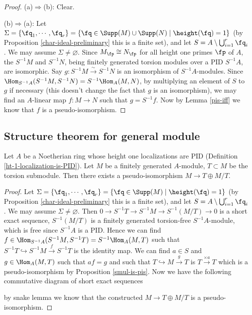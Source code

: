 \begin{proof}
(a)$\Rightarrow$(b): Clear.

(b)$\Rightarrow$(a): Let $\Sigma=\{\fq_1,\cdots,\fq_r\}
=\{\fq\in\Supp(M)\cup\Supp(N)\mid\height(\fq)=1\}$
(by Proposition \ref{char-ideal-preliminary} this is a finite set),
and let $S=A\setminus\bigcup_{i=1}^r\fq_i$.
We may assume $\Sigma\neq\varnothing$.
Since $M_\fp\cong N_\fp$ for all height one primes $\fp$ of $A$,
the $S^{-1}M$ and $S^{-1}N$, being finitely generated torsion modules over
a PID $S^{-1}A$, are isomorphic. Say $g:S^{-1}M\xrightarrow\sim S^{-1}N$
is an isomorphism of $S^{-1}A$-modules.
Since $\Hom_{S^{-1}A}(S^{-1}M,S^{-1}N)=S^{-1}\Hom_A(M,N)$,
by multiplying an element of $S$ to $g$ if necessary
(this doesn't change the fact that $g$ is an isomorphism), we may find
an $A$-linear map $f:M\to N$
such that $g=S^{-1}f$.
Now by Lemma \ref{pis-iff} we know that $f$ is a pseudo-isomorphism.
\end{proof}

\subsection{Structure theorem for general module}

\begin{prop}
\label{pis-torsion-oplus-torsion-free}
\leanok
Let $A$ be a Noetherian ring whose height one localizations are PID
(Definition \ref{ht-1-localization-is-PID}).
Let $M$ be a finitely generated $A$-module,
$T\subset M$ be the torsion submodule.
Then there exists a pseudo-isomorphism $M\to T\oplus M/T$.
\end{prop}

\begin{proof}
Let
$\Sigma=\{\fq_1,\cdots,\fq_r\}=\{\fq\in\Supp(M)\mid\height(\fq)=1\}$
(by Proposition \ref{char-ideal-preliminary} this is a finite set),
and let $S=A\setminus\bigcup_{i=1}^r\fq_i$.
We may assume $\Sigma\neq\varnothing$.
Then $0\to S^{-1}T\to S^{-1}M\to S^{-1}(M/T)\to 0$ is a short exact sequence,
$S^{-1}(M/T)$ is a finitely generated torsion-free $S^{-1}A$-module,
which is free since $S^{-1}A$ is a PID.
Hence we can find $f\in\Hom_{S^{-1}A}(S^{-1}M,S^{-1}T)=S^{-1}\Hom_A(M,T)$
such that $S^{-1}T\hookrightarrow S^{-1}M\xrightarrow{f}S^{-1}T$
is the identity map.
We can find $a\in S$ and $g\in\Hom_A(M,T)$ such that
$af=g$ and such that $T\hookrightarrow M\xrightarrow{g}T$
is $T\xrightarrow{\times a}T$ which is a pseudo-isomorphism by Proposition \ref{smul-is-pis}.
Now we have the following commutative diagram of short exact sequences
\begin{center}
\end{center}
by snake lemma we know that the constructed $M\to T\oplus M/T$
is a pseudo-isomorphism.
\end{proof}

